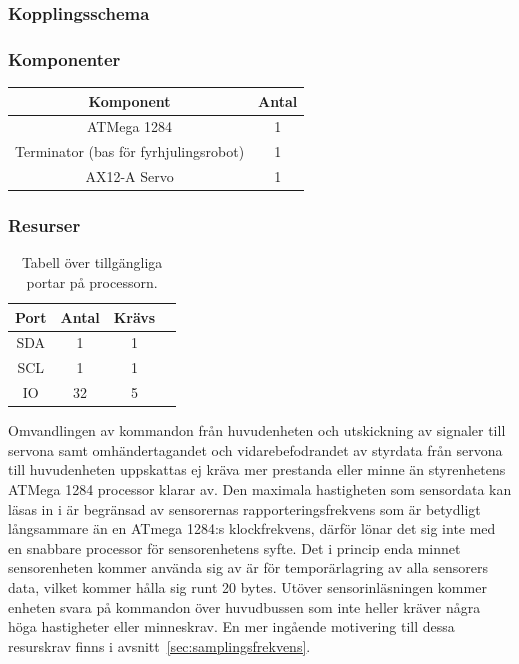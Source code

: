\documentclass{article}
\begin{document}
\subsubsection{Kopplingsschema}

\subsubsection{Komponenter}

\begin{table}[H]
  \centering
  \begin{tabular}{ | c | c |}
    \hline
    \textbf{Komponent} & \textbf{Antal} \\
    \hline
    ATMega 1284 & 1 \\
    \hline
    Terminator (bas för fyrhjulingsrobot) & 1 \\
    \hline
    AX12-A Servo & 1 \\
    \hline

  \end{tabular}
\end{table}

\subsubsection{Resurser}
\begin{table}[H]
  \centering
  \begin{tabular}{ | c | c | c | c |}
    \hline
    \textbf{Port} & \textbf{Antal} & \textbf{Krävs} \\
    \hline
    SDA & 1 & 1 \\
    \hline
    SCL & 1 & 1 \\
    \hline
    IO & 32 & 5 \\
    \hline
  \end{tabular}
  \caption{Tabell över tillgängliga portar på processorn.}
\end{table}

Omvandlingen av kommandon från huvudenheten och utskickning av signaler till servona samt omhändertagandet och vidarebefodrandet av styrdata från servona till huvudenheten uppskattas ej kräva mer prestanda eller minne än styrenhetens ATMega 1284 processor klarar av.
\newline\newline
Den maximala hastigheten som sensordata kan läsas in i är begränsad av sensorernas rapporteringsfrekvens som är betydligt långsammare än en ATmega 1284:s klockfrekvens, därför lönar det sig inte med en snabbare processor för sensorenhetens syfte. Det i princip enda minnet sensorenheten kommer använda sig av är för temporärlagring av alla sensorers data, vilket kommer hålla sig runt 20 bytes. Utöver sensorinläsningen kommer enheten svara på kommandon över huvudbussen som inte heller kräver några höga hastigheter eller minneskrav. En mer ingående motivering till dessa resurskrav finns i avsnitt~\ref{sec:samplingsfrekvens}.
\end{document}
